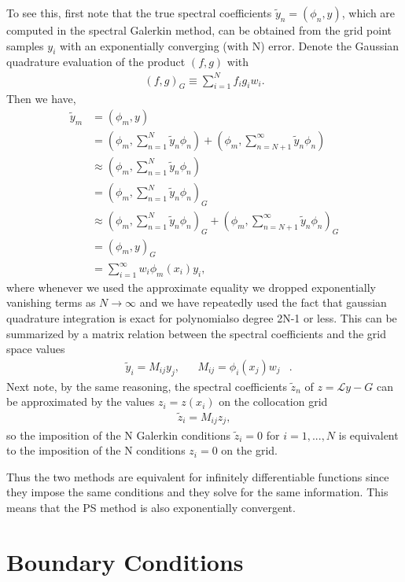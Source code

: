 \documentclass[aps,prd,amsmath,showpacs,amssymb,superscriptaddress,nofootinbib,longbibliography,eqsecnum,preprintnumbers]{revtex4-1}
\begin{document}
To see this, first note that the true spectral coefficients $\tilde y_n=(\phi_n,y)$, which are computed in the spectral Galerkin method, can be obtained from the grid point samples $y_i$ with an exponentially converging (with N) error. Denote the Gaussian quadrature evaluation of the product $(f,g)$ with
\begin{align}
(f,g)_G\equiv \sum_{i=1}^N f_ig_iw_i.
\end{align}
Then we have,
\begin{align}
\tilde y_m&=\left(\phi_m, y\right) \nonumber \\
&=\left(\phi_m, \sum_{n=1}^N\tilde y_n \phi_n\right) + \left(\phi_m, \sum_{n=N+1}^\infty\tilde y_n \phi_n\right) \nonumber \\
&\approx \left(\phi_m, \sum_{n=1}^N\tilde y_n \phi_n\right) \nonumber \\
&=\left(\phi_m, \sum_{n=1}^N\tilde y_n \phi_n\right)_G \nonumber \\
&\approx \left(\phi_m, \sum_{n=1}^N\tilde y_n \phi_n\right)_G +\left(\phi_m, \sum_{n=N+1}^\infty\tilde y_n \phi_n\right)_G \nonumber \\
&=\left(\phi_m, y\right)_G \nonumber \\
&=\sum_{i=1}^\infty w_i \phi_m(x_i)y_i,
\end{align}
where whenever we used the approximate equality we dropped exponentially vanishing terms as $N\to \infty$ and we have repeatedly used the fact that gaussian quadrature integration is exact for polynomialso degree 2N-1 or less. This can be summarized by a matrix relation between the spectral coefficients and the grid space values
\begin{align}
&\tilde y_i=M_{ij}y_j,& &M_{ij}=\phi_i(x_j)w_j&.
\end{align}
Next note, by the same reasoning, the spectral coefficients $\tilde z_n$ of $z=\mathcal L y-G$ can be approximated by the values $z_i=z(x_i)$ on the collocation grid
\begin{align}
\tilde z_i=M_{ij}z_j,
\end{align}
so the imposition of the N Galerkin conditions $\tilde z_i=0$ for $i=1,...,N$ is equivalent to the imposition of the N conditions $z_i=0$ on the grid. 

Thus the two methods are equivalent for infinitely differentiable functions since they impose the same conditions and they solve for the same information. This means that the PS method is also exponentially convergent.

\section{Boundary Conditions}
\end{document}
